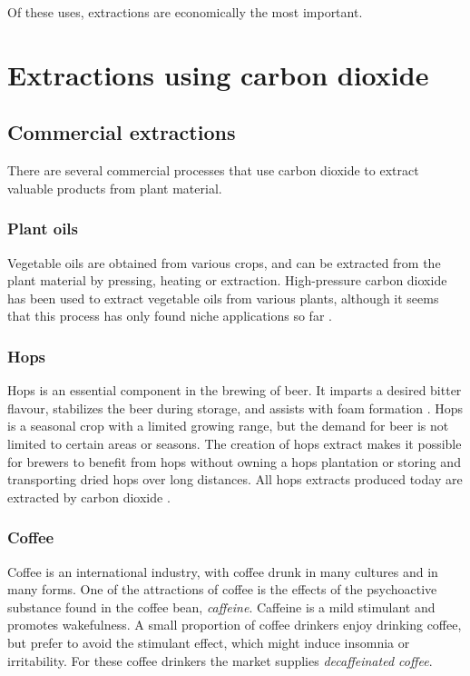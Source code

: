 Of these uses, extractions are economically the most important.

\section{Extractions using carbon dioxide}

\subsection{Commercial extractions}

There are several commercial processes that use carbon dioxide to extract
valuable products from plant material.

\subsubsection{Plant oils}

Vegetable oils are obtained from various crops, and can be extracted from the
plant material by pressing, heating or extraction. High-pressure carbon dioxide
has been used to extract vegetable oils from various plants, although it seems
that this process has only found niche applications so far
\autocite{Eisenmenger2006,Grazyna2018}.

\subsubsection{Hops}

Hops is an essential component in the brewing of beer. It imparts a desired
bitter flavour, stabilizes the beer during storage, and assists with foam
formation \autocite{Schoenberger2011}. Hops is a seasonal crop with a limited
growing range, but the demand for beer is not limited to certain areas or
seasons. The creation of hops extract makes it possible for brewers to benefit from 
hops without owning a hops plantation or storing and transporting dried hops
over long distances. All hops extracts produced today are extracted by carbon
dioxide \autocite{Hunt2010}.

\subsubsection{Coffee}

Coffee is an international industry, with coffee drunk in many cultures and in
many forms. One of the attractions of coffee is the effects of the psychoactive
substance found in the coffee bean, \textit{caffeine}. Caffeine is a mild
stimulant and promotes wakefulness. A small proportion of coffee drinkers enjoy
drinking coffee, but prefer to avoid the stimulant effect, which might induce
insomnia or irritability. For these coffee drinkers the market supplies
\textit{decaffeinated coffee}.

